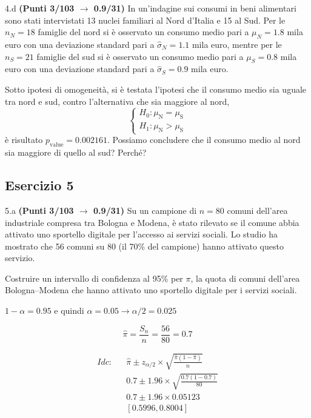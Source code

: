 \documentclass[
  11pt,
]{book}
\theoremstyle{mytheoremstyle}
\theoremstyle{mydefstyle}
\newenvironment{sol}
  {
  \begin{tcolorbox}[enhanced,breakable,arc=0.1mm,boxrule=1pt,colback=white,colframe=iblue,
  title=\bf \fontfamily{lmss}\selectfont \hspace{.5 cm} Soluzione,drop fuzzy shadow]

}{
\end{tcolorbox}
  }
\begin{document}
4.d \textbf{(Punti 3/103 \(\rightarrow\) 0.9/31)} In un'indagine sui consumi in beni alimentari sono stati intervistati 13 nuclei familiari al Nord d'Italia e 15 al Sud.
Per le \(n_N=18\) famiglie del nord si è osservato un consumo medio pari a \(\mu_N=1.8\) mila euro con una deviazione standard pari a \(\hat\sigma_N=1.1\) mila euro, mentre per le \(n_S=21\) famiglie del sud si è osservato un consumo medio pari a \(\mu_S=0.8\) mila euro con una deviazione standard pari a \(\hat\sigma_S=0.9\) mila euro.

Sotto ipotesi di omogeneità, si è testata l'ipotesi che il consumo medio sia uguale tra nord e sud, contro l'alternativa che sia maggiore al nord,
\[
\begin{cases}
   H_0: \mu_\text{N} = \mu_\text{S} \\
   H_1: \mu_\text{N} > \mu_\text{S} 
\end{cases}
\]
è risultato \(p_{\text{value}} = 0.002161\). Possiamo concludere che il consumo medio al nord sia maggiore di quello al sud? Perché?

\subsection{Esercizio 5}\label{esercizio-5-42}

5.a \textbf{(Punti 3/103 \(\rightarrow\) 0.9/31)} Su un campione di \(n = 80\) comuni dell'area industriale compresa tra Bologna e Modena, è stato rilevato se il comune abbia attivato uno sportello digitale per l'accesso ai servizi sociali. Lo studio ha mostrato che 56 comuni su 80 (il 70\% del campione) hanno attivato questo servizio.

Costruire un intervallo di confidenza al 95\% per \(\pi\), la quota di comuni dell'area Bologna--Modena che hanno attivato uno sportello digitale per i servizi sociali.

\begin{sol}
\(1-\alpha =0.95\) e quindi \(\alpha=0.05\rightarrow \alpha/2=0.025\)

\[
  \hat\pi = \frac{S_n}n = \frac{ 56 }{ 80 }= 0.7 
\]

\begin{eqnarray*}
  Idc: & &  \hat\pi \pm  z_{\alpha/2} \times \sqrt{\frac{\hat\pi(1-\hat\pi)}{n}} \\
     & &  0.7 \pm  1.96 \times \sqrt{\frac{ 0.7 (1- 0.7 )}{ 80 }} \\
     & &  0.7 \pm  1.96 \times  0.05123 \\
     & & [ 0.5996 ,  0.8004 ]
\end{eqnarray*}

\end{sol}
\end{document}

